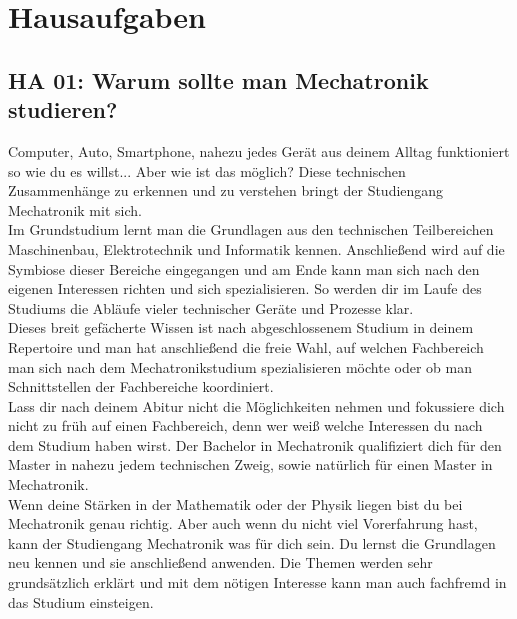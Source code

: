 \chapter{Hausaufgaben}
\section{HA 01: Warum sollte man Mechatronik studieren?}
  Computer, Auto, Smartphone, nahezu jedes Gerät aus deinem Alltag funktioniert so wie du es willst... Aber wie ist das möglich? Diese technischen Zusammenhänge zu erkennen und zu verstehen bringt der Studiengang Mechatronik mit sich.\\
  Im Grundstudium lernt man die Grundlagen aus den technischen Teilbereichen Maschinenbau, Elektrotechnik und Informatik kennen. Anschließend wird auf die Symbiose dieser Bereiche eingegangen und am Ende kann man sich nach den eigenen Interessen richten und sich spezialisieren. So werden dir im Laufe des Studiums die Abläufe vieler technischer Geräte und Prozesse klar.\\
  Dieses breit gefächerte Wissen ist nach abgeschlossenem Studium in deinem Repertoire und man hat anschließend die freie Wahl, auf welchen Fachbereich man sich nach dem Mechatronikstudium spezialisieren möchte oder ob man Schnittstellen der Fachbereiche koordiniert.\\
  Lass dir nach deinem Abitur nicht die Möglichkeiten nehmen und fokussiere   dich nicht zu früh auf einen Fachbereich, denn wer weiß welche Interessen du nach dem Studium haben wirst. Der Bachelor in Mechatronik qualifiziert dich für den Master in nahezu jedem technischen Zweig, sowie natürlich für einen Master in Mechatronik.\\
  Wenn deine Stärken in der Mathematik oder der Physik liegen bist du bei Mechatronik genau richtig. Aber auch wenn du nicht viel Vorerfahrung hast, kann der Studiengang Mechatronik was für dich sein. Du lernst die Grundlagen neu kennen und sie anschließend anwenden. Die Themen werden sehr grundsätzlich erklärt und mit dem nötigen Interesse kann man auch fachfremd in das Studium einsteigen.
